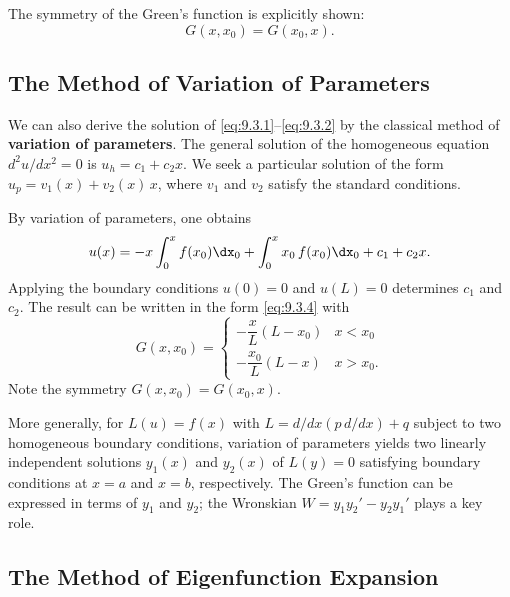The symmetry of the Green's function is explicitly shown:
\begin{equation}
\label{eq:9.3.7}
G(x,x_0) = G(x_0,x).
\end{equation}

\subsection{The Method of Variation of Parameters}
\label{sec:greens-var-params}

We can also derive the solution of \eqref{eq:9.3.1}--\eqref{eq:9.3.2} by the classical method of \textbf{variation of parameters}.  The general solution of the homogeneous equation $d^2u/dx^2 = 0$ is $u_h = c_1 + c_2 x$.  We seek a particular solution of the form $u_p = v_1(x) + v_2(x)\,x$, where $v_1$ and $v_2$ satisfy the standard conditions.

By variation of parameters, one obtains
\begin{equation}
\label{eq:9.3.8}
u(x) = -x\int_0^x f(x_0)\dx_0 + \int_0^x x_0\,f(x_0)\dx_0 + c_1 + c_2 x.
\end{equation}
Applying the boundary conditions $u(0)=0$ and $u(L)=0$ determines $c_1$ and $c_2$.  The result can be written in the form \eqref{eq:9.3.4} with
\begin{equation}
\label{eq:9.3.9}
\boxed{G(x,x_0) = \begin{cases} -\dfrac{x}{L}(L-x_0) & x < x_0 \\[6pt] -\dfrac{x_0}{L}(L-x) & x > x_0. \end{cases}}
\end{equation}
Note the symmetry $G(x,x_0) = G(x_0,x)$.

More generally, for $L(u) = f(x)$ with $L = d/dx(p\,d/dx) + q$ subject to two homogeneous boundary conditions, variation of parameters yields two linearly independent solutions $y_1(x)$ and $y_2(x)$ of $L(y)=0$ satisfying boundary conditions at $x=a$ and $x=b$, respectively.  The Green's function can be expressed in terms of $y_1$ and $y_2$; the Wronskian $W = y_1 y_2' - y_2 y_1'$ plays a key role.

\subsection{The Method of Eigenfunction Expansion}
\label{sec:greens-eigexp}

